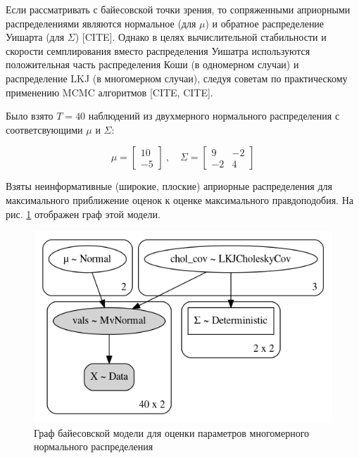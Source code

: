 \documentclass[a4paper,14pt]{extreport}
\begin{document}
Если рассматривать с байесовской точки зрения, то сопряженными априорными распределениями являются нормальное (для $\mu$) и обратное распределение Уишарта (для $\Sigma$) [CITE]. Однако в целях вычислительной стабильности и скорости семплирования вместо распределения Уишатра используются положительная часть распределения Коши (в одномерном случаи) и распределение LKJ (в многомерном случаи), следуя советам по практическому применению MCMC алгоритмов [CITE, CITE].

Было взято $T=40$ наблюдений из двухмерного нормального распределения с соответсвующими $\mu$ и $\Sigma$:

\[
	\mu = 
	\begin{bmatrix}
		10 \\
		-5
	\end{bmatrix}
	\	, \quad
	\Sigma = 
	\begin{bmatrix} 
		9  & -2 \\
		-2 & 4 
	\end{bmatrix}
\]

Взяты неинформативные (широкие, плоские) априорные распределения для максимального приближение оценок к оценке максимального правдоподобия. На рис. \ref{fig:pp_mvn_graph} отображен граф этой модели.

\begin{figure}[h!]
	\includegraphics[width=\linewidth]{img/gen/pp_mvn_graph.png}
	\caption{Граф байесовской модели для оценки параметров многомерного нормального распределения}
	\label{fig:pp_mvn_graph}
\end{figure}
\end{document}
